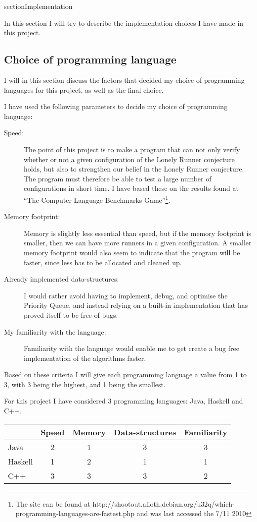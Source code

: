 section{Implementation}
\label{implementation}

In this section I will try to describe the implementation choices I have made in this project.

\subsection{Choice of programming language}
I will in this section discuss the factors that decided my choice of programming languages for this project, as well as the final choice.

I have used the following parameters to decide my choice of programming language:
\begin{description}
\item[Speed:] The point of this project is to make a program that can not only verify whether or not a given configuration of the Lonely Runner conjecture holds, but also to strengthen our belief in the Lonely Runner conjecture. The program must therefore be able to test a large number of configurations in short time. I have based these on the results found at ``The Computer Language Benchmarks Game''\footnote{The site can be found at http://shootout.alioth.debian.org/u32q/which-programming-languages-are-fastest.php and was last accessed the 7/11 2010}.
\item[Memory footprint:] Memory is slightly less essential than speed, but if the memory footprint is smaller, then we can have more runners in a given configuration. A smaller memory footprint would also seem to indicate that the program will be faster, since less has to be allocated and cleaned up. 
\item[Already implemented data-structures:] I would rather avoid having to implement, debug, and optimise the Priority Queue, and instead relying on a built-in implementation that has proved itself to be free of bugs.
\item[My familiarity with the language:] Familiarity with the language would enable me to get create a bug free implementation of the algorithms faster.
\end{description}

Based on these criteria I will give each programming language a value from 1 to 3, with 3 being the highest, and 1 being the smallest. 

For this project I have considered 3 programming languages: Java, Haskell and C++.

\begin{tabular}{l|c|c|c|c}
        & Speed & Memory & Data-structures & Familiarity \\
\hline
Java    & 2     &  1     &  3              &   3  \\
Haskell & 1     &  2     &  1              &   1  \\
C++     & 3     &  3     &  3              &   2  \\
\end{tabular}

